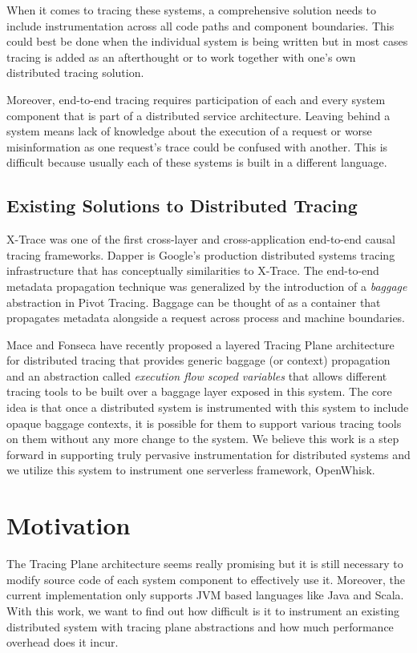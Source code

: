 When it comes to tracing these systems, a comprehensive solution needs to include instrumentation across all code paths and component boundaries. This could best be done when the individual system is being written but in most cases tracing is added as an afterthought or to work together with one's own distributed tracing solution.

Moreover, end-to-end tracing requires participation of each and every system component that is part of a distributed service architecture. Leaving behind a system means lack of knowledge about the execution of a request or worse misinformation as one request's trace could be confused with another. This is difficult because usually each of these systems is built in a different language.

\subsection{Existing Solutions to Distributed Tracing}
X-Trace\cite{Fonseca:2007:XPN:1973430.1973450} was one of the first cross-layer and cross-application end-to-end causal tracing frameworks. Dapper\cite{36356} is Google's production distributed systems tracing infrastructure that has conceptually similarities to X-Trace. The end-to-end metadata propagation technique was generalized by the introduction of a \emph{baggage} abstraction in Pivot Tracing\cite{Mace:2015:PTD:2815400.2815415}. Baggage can be thought of as a container that propagates metadata alongside a request across process and machine boundaries.

Mace and Fonseca have recently proposed a layered Tracing Plane architecture\cite{Mace17}\cite{Fonseca16} for distributed tracing that provides generic baggage (or context) propagation and an abstraction called \emph{execution flow scoped variables} that allows different tracing tools to be built over a baggage layer exposed in this system. The core idea is that once a distributed system is instrumented with this system to include opaque baggage contexts, it is possible for them to support various tracing tools on them without any more change to the system. We believe this work is a step forward in supporting truly pervasive instrumentation for distributed systems and we utilize this system to instrument one serverless framework, OpenWhisk.


\section{Motivation}

The Tracing Plane architecture seems really promising but it is still necessary to modify source code of each system component to effectively use it. Moreover, the current implementation only supports JVM based languages like Java and Scala. With this work, we want to find out how difficult is it to instrument an existing distributed system with tracing plane abstractions and how much performance overhead does it incur.
